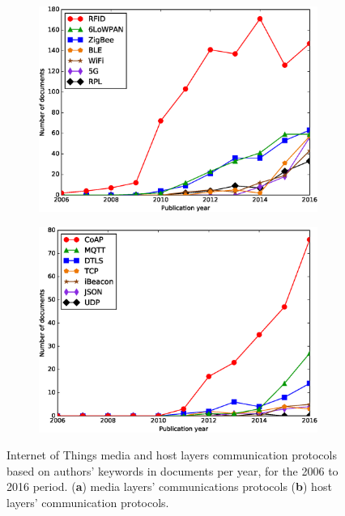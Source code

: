 \documentclass[symmetry,article,accept,moreauthors,pdftex10pt,a4paper]{mdpi}
\begin{document}
\unskip
\begin{figure}[H]
	\centering
	\begin{subfigure}[b]{0.49\textwidth}
		\includegraphics[width=\textwidth]{./graphs/figure6a.eps}
		\caption{}
		\label{fig_media_layers}
	\end{subfigure}
	\begin{subfigure}[b]{0.49\textwidth}
		\includegraphics[width=\textwidth]{./graphs/figure6b.eps}
		\caption{}
		\label{fig_host_layers}
	\end{subfigure}
		\vspace{-12pt}
	\caption{Internet of Things media and host layers communication protocols based on authors' keywords in documents per year, for the 2006 to 2016 period.  (\textbf{a}) media layers' communications protocols (\textbf{b}) host layers' communication protocols.}
	\label{fig_comms_protocols}
\end{figure}
\end{document}
